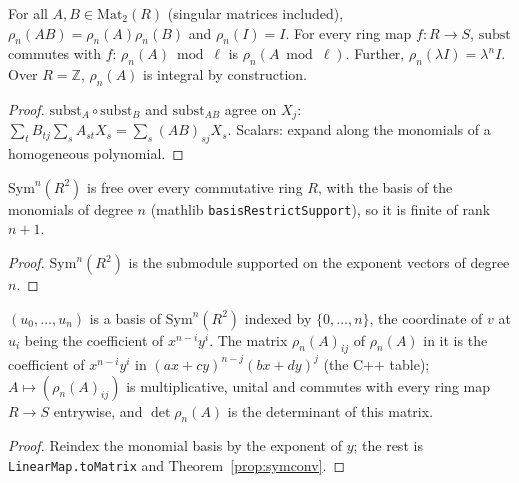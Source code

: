 \begin{theorem}\label{prop:symconv}
  \leanok
  For all $A,B\in\mathrm{Mat}_2(R)$ (singular matrices included), $\rho_n(AB)=\rho_n(A)\rho_n(B)$ and $\rho_n(I)=I$. For
  every ring map $f\colon R\to S$, $\mathrm{subst}$ commutes with $f$: $\rho_n(A)\bmod\ell$ is $\rho_n(A\bmod\ell)$.
  Further, $\rho_n(\lambda I)=\lambda^nI$. Over $R=\mathbb Z$, $\rho_n(A)$ is integral by construction.
\end{theorem}
\begin{proof}
  \leanok
  $\mathrm{subst}_A\circ\mathrm{subst}_B$ and $\mathrm{subst}_{AB}$ agree on $X_j$:
  $\sum_t B_{tj}\sum_s A_{st}X_s=\sum_s(AB)_{sj}X_s$. Scalars: expand along the monomials of a homogeneous polynomial.
\end{proof}

\begin{theorem}\label{inf:symbasis}
  \leanok
  $\mathrm{Sym}^n(R^2)$ is free over every commutative ring $R$, with the basis of the monomials of degree $n$
  (mathlib \texttt{basisRestrictSupport}), so it is finite of rank $n+1$.
\end{theorem}
\begin{proof}
  \leanok
  $\mathrm{Sym}^n(R^2)$ is the submodule supported on the exponent vectors of degree $n$.
\end{proof}

\begin{theorem}\label{inf:rhomat}
  \leanok
  $(u_0,\dots,u_n)$ is a basis of $\mathrm{Sym}^n(R^2)$ indexed by $\{0,\dots,n\}$, the coordinate of $v$ at $u_i$ being
  the coefficient of $x^{n-i}y^i$. The matrix $\rho_n(A)_{ij}$ of $\rho_n(A)$ in it is the coefficient of
  $x^{n-i}y^i$ in $(ax+cy)^{n-j}(bx+dy)^j$ (the C++ table); $A\mapsto(\rho_n(A)_{ij})$ is multiplicative,
  unital and commutes with every ring map $R\to S$ entrywise, and $\det\rho_n(A)$ is the determinant of this matrix.
\end{theorem}
\begin{proof}
  \leanok
  Reindex the monomial basis by the exponent of $y$; the rest is \texttt{LinearMap.toMatrix} and
  Theorem~\ref{prop:symconv}.
\end{proof}

